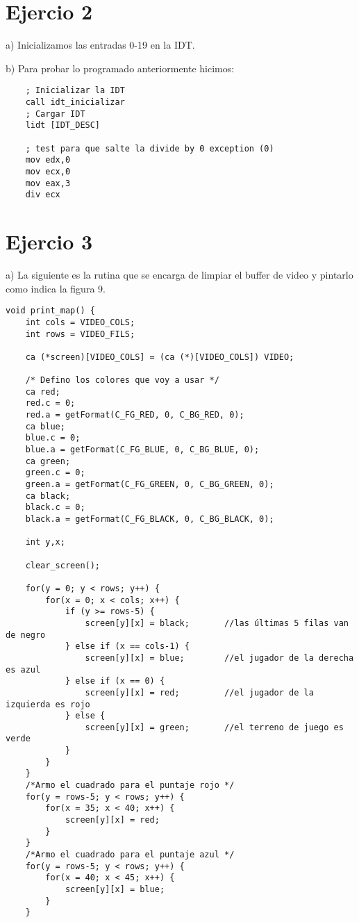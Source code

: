\documentclass[a4paper]{article}
\begin{document}
\newpage
\section{Ejercio 2}
{\large a)} Inicializamos las entradas 0-19 en la IDT.





{\large b)} Para probar lo programado anteriormente hicimos:

\begin{codesnippet}
\begin{verbatim}
    ; Inicializar la IDT
    call idt_inicializar
    ; Cargar IDT
    lidt [IDT_DESC]

    ; test para que salte la divide by 0 exception (0)
    mov edx,0
    mov ecx,0
    mov eax,3
    div ecx
\end{verbatim}
\end{codesnippet}

\newpage
\section{Ejercio 3}
{\large a)} La siguiente es la rutina que se encarga de limpiar el buffer de video y pintarlo como indica
la figura 9. 

\begin{codesnippet}
\begin{verbatim}
void print_map() {
    int cols = VIDEO_COLS;
    int rows = VIDEO_FILS;

    ca (*screen)[VIDEO_COLS] = (ca (*)[VIDEO_COLS]) VIDEO;

	/* Defino los colores que voy a usar */
    ca red;
    red.c = 0;
    red.a = getFormat(C_FG_RED, 0, C_BG_RED, 0);
    ca blue;
    blue.c = 0;
    blue.a = getFormat(C_FG_BLUE, 0, C_BG_BLUE, 0);
    ca green;
    green.c = 0;
    green.a = getFormat(C_FG_GREEN, 0, C_BG_GREEN, 0);
    ca black;
    black.c = 0;
    black.a = getFormat(C_FG_BLACK, 0, C_BG_BLACK, 0);

    int y,x;

    clear_screen();
    
    for(y = 0; y < rows; y++) {
        for(x = 0; x < cols; x++) {
            if (y >= rows-5) {
                screen[y][x] = black;		//las últimas 5 filas van de negro
            } else if (x == cols-1) {
                screen[y][x] = blue;		//el jugador de la derecha es azul
            } else if (x == 0) {
                screen[y][x] = red;			//el jugador de la izquierda es rojo
            } else {
                screen[y][x] = green;		//el terreno de juego es verde
            }
        }
    }
    /*Armo el cuadrado para el puntaje rojo */
    for(y = rows-5; y < rows; y++) {
        for(x = 35; x < 40; x++) {
            screen[y][x] = red;
        }
    }
    /*Armo el cuadrado para el puntaje azul */
    for(y = rows-5; y < rows; y++) {
        for(x = 40; x < 45; x++) {
            screen[y][x] = blue;
        }
    }

\end{verbatim}
\end{codesnippet}
\end{document}
